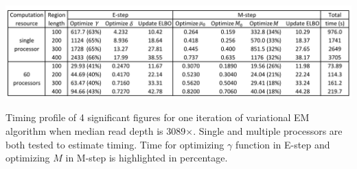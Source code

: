 \documentclass[11pt,reqno]{amsart}
\begin{document}
\begin{table}[htbp]
\centering
\vspace{10pt}
\includegraphics[width=1.0\textwidth]{tables/time_3089X_all_update.png}
\caption{Timing profile of 4 significant figures for one iteration of variational EM algorithm when median read depth is 3089$\times$.
Single and multiple processors are both tested to estimate timing. Time for optimizing $\gamma$ function in E-step and optimizing $M$ in M-step is highlighted in percentage.}
\label{tbl:timing_profile_all}
\end{table}
\end{document}

